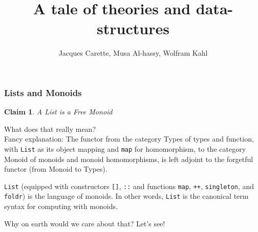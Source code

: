 \documentclass[serif,mathserif,professionalfont,10pt]{beamer}
\title{A tale of theories and data-structures}
\author[Carette, Al-hassy, Kahl]{Jacques Carette, Musa Al-hassy, Wolfram Kahl}
\institute[McMaster]{McMaster University, Hamilton}
\newcommand{\sred}[1]{\textcolor{slidered}{#1}}
\newcommand{\sblue}[1]{\textcolor{slideblue}{#1}}
\newcommand{\sgreen}[1]{\textcolor{slidegreen}{#1}}
\newtheorem{claim}{Claim}
\begin{document}
\frame{\titlepage}

\begin{frame}
\frametitle{Lists and Monoids}
\begin{claim}
A \sred{List} is a \sred{Free Monoid}
\end{claim}
What does that really mean? \\

\pause
\vspace*{4mm}
\sred{Fancy explanation}: The functor from the category \textsf{Types} of \sgreen{types and function}, with
\texttt{List} as its object mapping and \texttt{map} for homomorphism,
to the category \textsf{Monoid} of \sgreen{monoids and monoid homomorphisms}, is \sblue{left
adjoint} to the forgetful functor (from \textsf{Monoid} to \textsf{Types}).
%
%

\pause
\vspace*{4mm}
\texttt{List} (equipped with constructors \texttt{[]}, \texttt{::} and
functions \texttt{map}, \texttt{++},
\texttt{singleton}, and \texttt{foldr}) is the
\sblue{language of monoids}. In other words, \texttt{List} 
is the canonical term syntax for 
\sblue{computing with monoids}.

\pause
\vspace*{4mm}
Why on earth would we care about that? Let's see!

\vfill
\end{frame}
\end{document}

